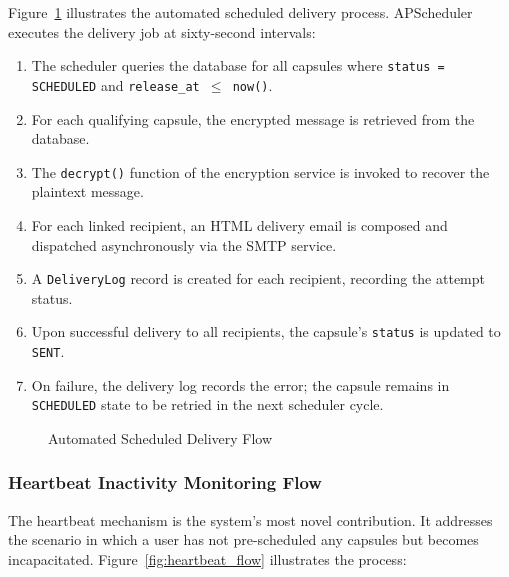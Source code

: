 \documentclass[12pt, a4paper]{article}
\begin{document}
Figure~\ref{fig:delivery_flow} illustrates the automated scheduled delivery process. APScheduler executes the delivery job at sixty-second intervals:

\begin{enumerate}
  \item The scheduler queries the database for all capsules where \texttt{status = SCHEDULED} and \texttt{release\_at $\leq$ now()}.
  \item For each qualifying capsule, the encrypted message is retrieved from the database.
  \item The \texttt{decrypt()} function of the encryption service is invoked to recover the plaintext message.
  \item For each linked recipient, an HTML delivery email is composed and dispatched asynchronously via the SMTP service.
  \item A \texttt{DeliveryLog} record is created for each recipient, recording the attempt status.
  \item Upon successful delivery to all recipients, the capsule's \texttt{status} is updated to \texttt{SENT}.
  \item On failure, the delivery log records the error; the capsule remains in \texttt{SCHEDULED} state to be retried in the next scheduler cycle.
\end{enumerate}

\begin{figure}[H]
  \centering
  \caption{Automated Scheduled Delivery Flow}
  \label{fig:delivery_flow}
\end{figure}

\subsubsection{Heartbeat Inactivity Monitoring Flow}

The heartbeat mechanism is the system's most novel contribution. It addresses the scenario in which a user has not pre-scheduled any capsules but becomes incapacitated. Figure~\ref{fig:heartbeat_flow} illustrates the process:
\end{document}

